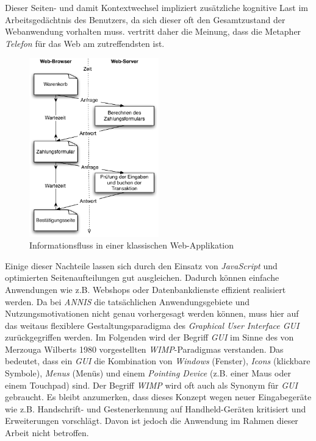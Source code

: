 Dieser Seiten- und damit Kontextwechsel impliziert zusätzliche kognitive Last im Arbeitsgedächtnis des Benutzers, da sich dieser oft den Gesamtzustand der Webanwendung vorhalten muss. \cite{nielsen1997metaphor} vertritt daher die Meinung, dass die Metapher \emph{Telefon} für das Web am zutreffendsten ist. 

\begin{figure}[H]
	\centering
	\includegraphics*[width=0.5\textwidth]{figures/DA/WebApplication_Informationsfluss.pdf}
	\caption{Informationsfluss in einer klassischen Web-Applikation}\label{fig:WebApplication.Informationsfluss}
\end{figure}

Einige dieser Nachteile lassen sich durch den Einsatz von \emph{JavaScript} und optimierten Seitenaufteilungen gut ausgleichen. Dadurch können einfache Anwendungen wie z.B. Webshops oder Datenbankdienste effizient realisiert werden. Da bei \emph{ANNIS} die tatsächlichen Anwendungsgebiete und Nutzungsmotivationen nicht genau vorhergesagt werden können, muss hier auf das weitaus flexiblere Gestaltungsparadigma des \emph{Graphical User Interface GUI} zurückgegriffen werden. Im Folgenden wird der Begriff \emph{GUI} im Sinne des von Merzouga Wilberts 1980 vorgestellten \emph{WIMP}-Paradigmas verstanden. Das bedeutet, dass ein \emph{GUI} die Kombination von \emph{Windows} (Fenster), \emph{Icons} (klickbare Symbole), \emph{Menus} (Menüs) und einem \emph{Pointing Device} (z.B. einer Maus oder einem Touchpad) sind. Der Begriff \emph{WIMP} wird oft auch als Synonym für \emph{GUI} gebraucht. Es bleibt anzumerken, dass \cite{dam97postwimp} dieses Konzept wegen neuer Eingabegeräte wie z.B. Handschrift- und Gestenerkennung auf Handheld-Geräten kritisiert und Erweiterungen vorschlägt. Davon ist jedoch die Anwendung im Rahmen dieser Arbeit nicht betroffen.

